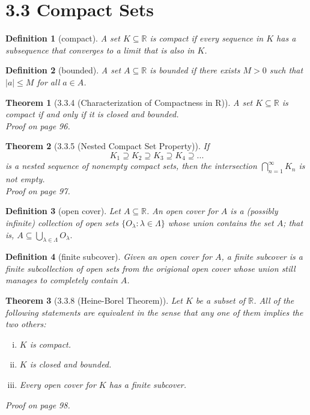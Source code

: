 \documentclass{article}
\newtheorem{definition}{Definition}
\newtheorem{thm}{Theorem}
\begin{document}
\section*{3.3 Compact Sets}
\begin{definition}[compact]
    A set $K \subseteq \mathbb{R}$ is compact if every sequence in $K$ has a subsequence that converges to a limit that is also in $K$.
\end{definition}

\begin{definition}[bounded]
    A set $A \subseteq \mathbb{R}$ is bounded if there exists $M > 0$ such that $|a| \leq M$ for all $a \in A$.
\end{definition}

\begin{thm}[3.3.4 (Characterization of Compactness in R)]
    A set $K \subseteq \mathbb{R}$ is compact if and only if it is closed and bounded. \\ Proof on page 96.
\end{thm}

\begin{thm}[3.3.5 (Nested Compact Set Property)]
    If \[K_1 \supseteq K_2 \supseteq K_3 \supseteq K_4 \supseteq ...\] is a nested sequence of nonempty compact sets, then the intersection $\bigcap _{n=1}^\infty K_n$ is not empty. \\ Proof on page 97.
\end{thm}

\begin{definition}[open cover]
    Let $A \subseteq \mathbb{R}$. An open cover for $A$ is a (possibly infinite) collection of open sets $\{O_\lambda : \lambda \in \Lambda\}$ whose union contains the set $A$; that is, $A \subseteq \bigcup _{\lambda \in \Lambda} O_\lambda .$
\end{definition}

\begin{definition}[finite subcover]
    Given an open cover for $A$, a finite subcover is a finite subcollection of open sets from the origional open cover whose union still manages to completely contain $A$.
\end{definition}

\begin{thm}[3.3.8 (Heine-Borel Theorem)]
    Let $K$ be a subset of $\mathbb{R}$. All of the following statements are equivalent in the sense that any one of them implies the two others:
    \begin{enumerate}[(i)]
        \item $K$ is compact.
        \item $K$ is closed and bounded.
        \item Every open cover for $K$ has a finite subcover.
    \end{enumerate}
    Proof on page 98.
\end{thm}
\end{document}
